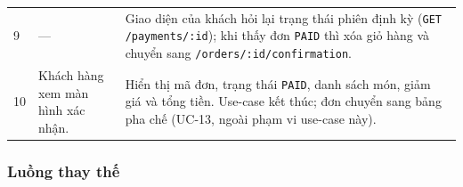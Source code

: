 \begin{longtable}{@{}p{0.8cm}p{5.4cm}p{9.8cm}@{}}
9 & ---
  & Giao diện của khách hỏi lại trạng thái phiên định kỳ (\texttt{GET /payments/:id}); khi thấy đơn \texttt{PAID} thì xóa giỏ hàng và chuyển sang \texttt{/orders/:id/confirmation}. \\
10 & Khách hàng xem màn hình xác nhận.
  & Hiển thị mã đơn, trạng thái \texttt{PAID}, danh sách món, giảm giá và tổng tiền. Use-case kết thúc; đơn chuyển sang bảng pha chế (UC-13, ngoài phạm vi use-case này). \\
\bottomrule
\end{longtable}

\subsubsection{Luồng thay thế}

